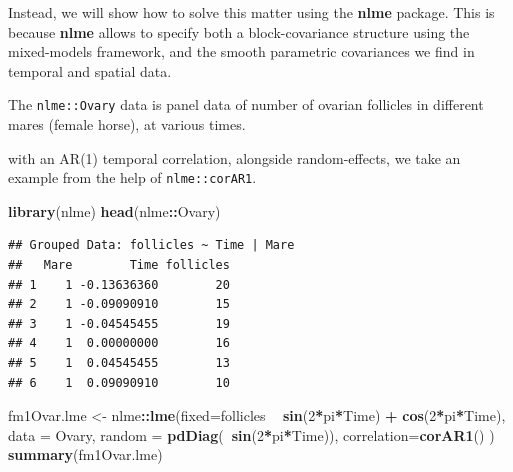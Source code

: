 \documentclass[]{book}
\newenvironment{Shaded}{\begin{snugshade}}{\end{snugshade}}
\newcommand{\KeywordTok}[1]{\textcolor[rgb]{0.13,0.29,0.53}{\textbf{#1}}}
\newcommand{\DataTypeTok}[1]{\textcolor[rgb]{0.13,0.29,0.53}{#1}}
\newcommand{\DecValTok}[1]{\textcolor[rgb]{0.00,0.00,0.81}{#1}}
\newcommand{\StringTok}[1]{\textcolor[rgb]{0.31,0.60,0.02}{#1}}
\newcommand{\OperatorTok}[1]{\textcolor[rgb]{0.81,0.36,0.00}{\textbf{#1}}}
\newcommand{\NormalTok}[1]{#1}
\theoremstyle{definition}
\theoremstyle{definition}
\theoremstyle{definition}
\theoremstyle{remark}
\begin{document}
Instead, we will show how to solve this matter using the \textbf{nlme}
package. This is because \textbf{nlme} allows to specify both a
block-covariance structure using the mixed-models framework, and the
smooth parametric covariances we find in temporal and spatial data.

The \texttt{nlme::Ovary} data is panel data of number of ovarian
follicles in different mares (female horse), at various times.

with an AR(1) temporal correlation, alongside random-effects, we take an
example from the help of \texttt{nlme::corAR1}.

\begin{Shaded}
\begin{Highlighting}[]
\KeywordTok{library}\NormalTok{(nlme)}
\KeywordTok{head}\NormalTok{(nlme}\OperatorTok{::}\NormalTok{Ovary)}
\end{Highlighting}
\end{Shaded}

\begin{verbatim}
## Grouped Data: follicles ~ Time | Mare
##   Mare        Time follicles
## 1    1 -0.13636360        20
## 2    1 -0.09090910        15
## 3    1 -0.04545455        19
## 4    1  0.00000000        16
## 5    1  0.04545455        13
## 6    1  0.09090910        10
\end{verbatim}

\begin{Shaded}
\begin{Highlighting}[]
\NormalTok{fm1Ovar.lme <-}\StringTok{ }\NormalTok{nlme}\OperatorTok{::}\KeywordTok{lme}\NormalTok{(}\DataTypeTok{fixed=}\NormalTok{follicles }\OperatorTok{~}\StringTok{ }\KeywordTok{sin}\NormalTok{(}\DecValTok{2}\OperatorTok{*}\NormalTok{pi}\OperatorTok{*}\NormalTok{Time) }\OperatorTok{+}\StringTok{ }\KeywordTok{cos}\NormalTok{(}\DecValTok{2}\OperatorTok{*}\NormalTok{pi}\OperatorTok{*}\NormalTok{Time), }
                   \DataTypeTok{data =}\NormalTok{ Ovary, }
                   \DataTypeTok{random =} \KeywordTok{pdDiag}\NormalTok{(}\OperatorTok{~}\KeywordTok{sin}\NormalTok{(}\DecValTok{2}\OperatorTok{*}\NormalTok{pi}\OperatorTok{*}\NormalTok{Time)), }
                   \DataTypeTok{correlation=}\KeywordTok{corAR1}\NormalTok{() )}
\KeywordTok{summary}\NormalTok{(fm1Ovar.lme)}
\end{Highlighting}
\end{Shaded}
\end{document}
